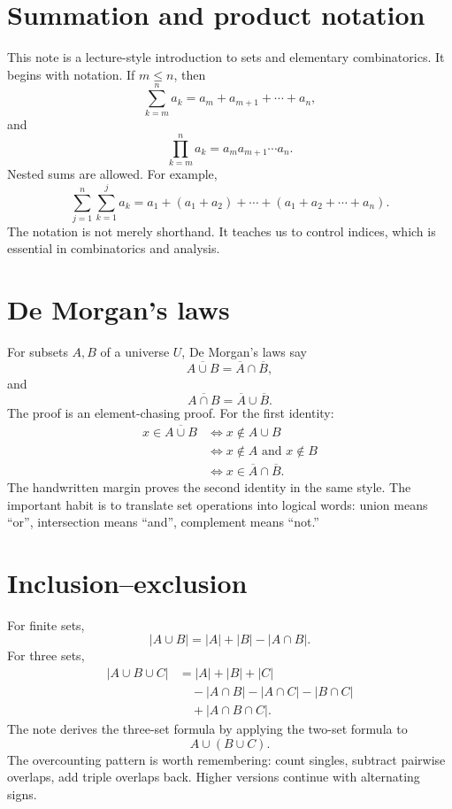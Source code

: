 
\section{Summation and product notation}

This note is a lecture-style introduction to sets and elementary combinatorics.  It begins with notation.  If \(m\le n\), then
\[
  \sum_{k=m}^n a_k=a_m+a_{m+1}+\cdots+a_n,
\]
and
\[
  \prod_{k=m}^n a_k=a_m a_{m+1}\cdots a_n.
\]
Nested sums are allowed.  For example,
\[
  \sum_{j=1}^n\sum_{k=1}^j a_k
  =
  a_1+(a_1+a_2)+\cdots+(a_1+a_2+\cdots+a_n).
\]
The notation is not merely shorthand.  It teaches us to control indices, which is essential in combinatorics and analysis.

\section{De Morgan's laws}

For subsets \(A,B\) of a universe \(U\), De Morgan's laws say
\[
  \overline{A\cup B}=\overline A\cap\overline B,
\]
and
\[
  \overline{A\cap B}=\overline A\cup\overline B.
\]
The proof is an element-chasing proof.  For the first identity:
\[
\begin{aligned}
 x\in\overline{A\cup B}
 &\Longleftrightarrow x\notin A\cup B\\
 &\Longleftrightarrow x\notin A\text{ and }x\notin B\\
 &\Longleftrightarrow x\in\overline A\cap\overline B.
\end{aligned}
\]
The handwritten margin proves the second identity in the same style.  The important habit is to translate set operations into logical words: union means ``or'', intersection means ``and'', complement means ``not.''

\section{Inclusion--exclusion}

For finite sets,
\[
  |A\cup B|=|A|+|B|-|A\cap B|.
\]
For three sets,
\[
\begin{aligned}
|A\cup B\cup C|
&=|A|+|B|+|C|\\
&\quad-|A\cap B|-|A\cap C|-|B\cap C|\\
&\quad+|A\cap B\cap C|.
\end{aligned}
\]
The note derives the three-set formula by applying the two-set formula to
\[
  A\cup(B\cup C).
\]
The overcounting pattern is worth remembering: count singles, subtract pairwise overlaps, add triple overlaps back.  Higher versions continue with alternating signs.

